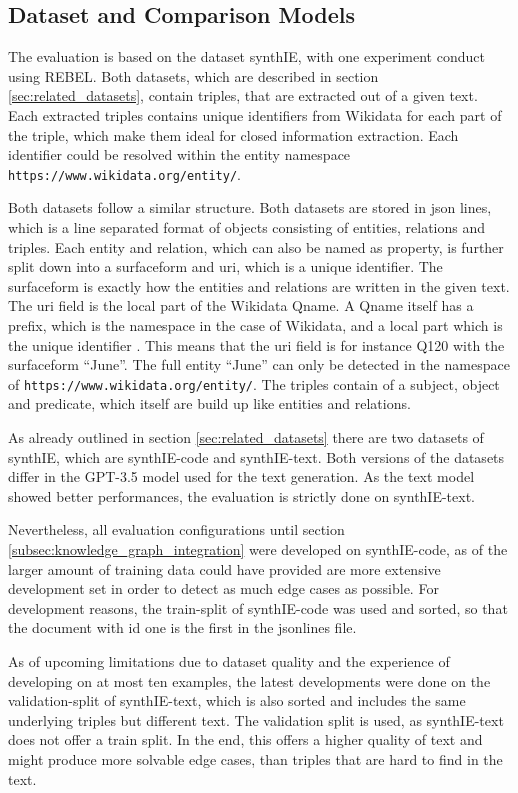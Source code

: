 \documentclass[a4paper,oneside,bibliography=totoc]{scrbook}
\begin{document}
\subsection{Dataset and Comparison Models}
\label{sec:dataset}

The evaluation is based on the dataset synthIE, with one experiment conduct using REBEL. Both datasets, which are described in section \ref{sec:related_datasets}, contain triples, that are extracted out of a given text. Each extracted triples contains unique identifiers from Wikidata for each part of the triple, which make them ideal for closed information extraction. Each identifier could be resolved within the entity namespace \texttt{https://www.wikidata.org/entity/}.

Both datasets follow a similar structure. Both datasets are stored in json lines, which is a line separated format of objects consisting of entities, relations and triples. Each entity and relation, which can also be named as property, is further split down into a surfaceform and uri, which is a unique identifier. The surfaceform is exactly how the entities and relations are written in the given text. The uri field is the local part of the Wikidata Qname. A Qname itself has a prefix, which is the namespace in the case of Wikidata, and a local part which is the unique identifier \cite{ASF2010}. This means that the uri field is for instance Q120 with the surfaceform \enquote{June}. The full entity \enquote{June} can only be detected in the namespace of \texttt{https://www.wikidata.org/entity/}. The triples contain of a subject, object and predicate, which itself are build up like entities and relations.

As already outlined in section \ref{sec:related_datasets} there are two datasets of synthIE, which are synthIE-code and synthIE-text. Both versions of the datasets differ in the GPT-3.5 model used for the text generation. As the text model showed better performances, the evaluation is strictly done on synthIE-text.

Nevertheless, all evaluation configurations until section \ref{subsec:knowledge_graph_integration} were developed on synthIE-code, as of the larger amount of training data could have provided are more extensive development set in order to detect as much edge cases as possible. For development reasons, the train-split of synthIE-code was used and sorted, so that the document with id one is the first in the jsonlines file.

As of upcoming limitations due to dataset quality and the experience of developing on at most ten examples, the latest developments were done on the validation-split of synthIE-text, which is also sorted and includes the same underlying triples but different text. The validation split is used, as synthIE-text does not offer a train split. In the end, this offers a higher quality of text and might produce more solvable edge cases, than triples that are hard to find in the text.
\end{document}
